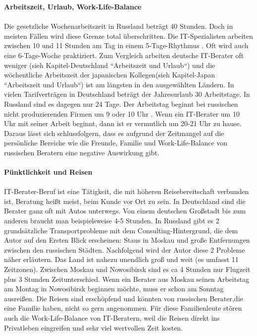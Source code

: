 	 \textbf{Arbeitszeit, Urlaub, Work-Life-Balance}\\ %
	 \\
	 Die gesetzliche Wochenarbeitszeit in Russland beträgt 40 Stunden. Doch in meisten Fällen wird diese Grenze total überschritten. Die IT-Spezialisten arbeiten zwischen 10 und 11 Stunden am Tag in einem 5-Tage-Rhythmus \cite{ArbZeitRU}. 
	  Oft wird auch eine 6-Tage-Woche praktiziert. Zum Vergleich arbeiten deutsche IT-Berater oft weniger (sieh Kapitel-Deutschland ``Arbeitszeit und Urlaub``) und die wöchentliche Arbeitszeit der japanischen Kollegen(sieh Kapitel-Japan ``Arbeitszeit und Urlaub``) ist am längsten in den ausgewählten Ländern. 
	 In vielen Tarifverträgen in Deutschland beträgt der Jahresurlaub 30 Arbeitstage. In Russland sind es dagegen nur 24 Tage. Der Arbeitstag beginnt bei russischen nicht produzierenden Firmen um 9 oder 10 Uhr \cite{ArbZeitRU}. Wenn ein IT-Berater um 10 Uhr mit seiner Arbeit beginnt, dann ist er vermutlich um 20-21 Uhr zu hause. Daraus lässt sich schlussfolgern, dass es aufgrund der Zeitmangel auf die persönliche Bereiche wie die Freunde, Familie und Work-Life-Balance von russischen Beratern eine negative Auswirkung gibt.   \\ \\
	 \textbf{Pünktlichkeit und Reisen }\\
	 \\
	 IT-Berater-Beruf ist eine Tätigkeit, die mit höheren Reisebereitschaft verbunden ist, Beratung heißt meist, beim Kunde vor Ort zu sein. In Deutschland sind die Berater ganz oft mit Autos unterwegs. Von einem deutschen Großstadt bis zum anderen braucht man beispielsweise 4-5 Stunden. In Russland gibt es 2 grundsätzliche Transportprobleme mit dem Consulting-Hintergrund, die dem Autor auf den Ersten Blick erscheinen: Staus in Moskau und große Entfernungen zwischen den russischen Städten. Nachfolgend wird der Autor diese 2 Probleme näher erläutern. Das Land ist nahezu unendlich groß und weit (es umfasst 11 Zeitzonen).
	 Zwischen Moskau und Nowosibirsk sind es ca 4 Stunden nur Flugzeit plus 3 Stunden Zeitunterschied. Wenn ein Berater aus Moskau seinen Arbeitstag am Montag in Nowosibirsk beginnen möchte, muss er schon am Sonntag ausreißen. Die Reisen sind erschöpfend und könnten von russischen Berater,die eine Familie haben, nicht so gern angenommen. Für diese Familienleute stören auch die Work-Life-Balance von IT-Beratern, weil die Reisen direkt ins Privatleben eingreifen und sehr viel wertvollen Zeit kosten.\\

